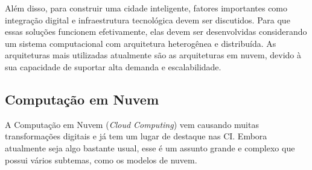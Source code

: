 Além disso, para construir uma cidade inteligente, fatores importantes como integração digital e infraestrutura tecnológica devem ser discutidos. Para que essas soluções funcionem efetivamente, elas devem ser desenvolvidas considerando um sistema computacional com arquitetura heterogênea e distribuída. As arquiteturas mais utilizadas atualmente são as arquiteturas em nuvem, devido à sua capacidade de suportar alta demanda e escalabilidade.

\subsection{Computação em Nuvem}
A Computação em Nuvem (\textit{Cloud Computing}) vem causando muitas transformações digitais e já tem um lugar de destaque nas CI. Embora atualmente seja algo bastante usual, esse é um assunto grande e complexo que possui vários subtemas, como os modelos de nuvem.

